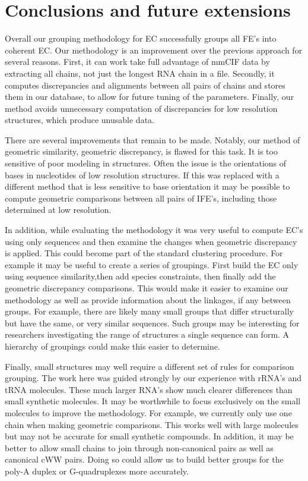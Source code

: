 \section{Conclusions and future extensions}

Overall our grouping methodology for EC successfully groups all FE's into
coherent EC\@. Our methodology is an improvement over the previous approach for
several reasons. First, it can work take full advantage of mmCIF data by
extracting all chains, not just the longest RNA chain in a file. Secondly, it
computes discrepancies and alignments between all pairs of chains and stores
them in our database, to allow for future tuning of the parameters. Finally, our
method avoids unnecessary computation of discrepancies for low resolution
structures, which produce unusable data. 

There are several improvements that remain to be made. Notably, our method of
geometric similarity, geometric discrepancy, is flawed for this task. It is too
sensitive of poor modeling in structures. Often the issue is the orientations of
bases in nucleotides of low resolution structures. If this was replaced with a
different method that is less sensitive to base orientation it may be possible
to compute geometric comparisons between all pairs of IFE's, including those
determined at low resolution.

In addition, while evaluating the methodology it was very useful to compute EC's
using only sequences and then examine the changes when geometric discrepancy is
applied. This could become part of the standard clustering procedure. For
example it may be useful to create a series of groupings. First build the EC
only using sequence similarity,then add species constraints, then finally add
the geometric discrepancy comparisons. This would make it easier to examine our
methodology as well as provide information about the linkages, if any between
groups. For example, there are likely many small groups that differ structurally
but have the same, or very similar sequences. Such groups may be interesting for
researchers investigating the range of structures a single sequence can form. A
hierarchy of groupings could make this easier to determine.

Finally, small structures may well require a different set of rules for
comparison grouping. The work here was guided strongly by our experience with
rRNA's and tRNA molecules. These much larger RNA's show much clearer differences
than small synthetic molecules. It may be worthwhile to focus exclusively on the
small molecules to improve the methodology. For example, we currently only use
one chain when making geometric comparisons. This works well with large
molecules but may not be accurate for small synthetic compounds. In addition, it
may be better to allow small chains to join through non-canonical pairs as well
as canonical cWW pairs. Doing so could allow us to build better groups for the
poly-A duplex or G-quadruplexes more accurately.
